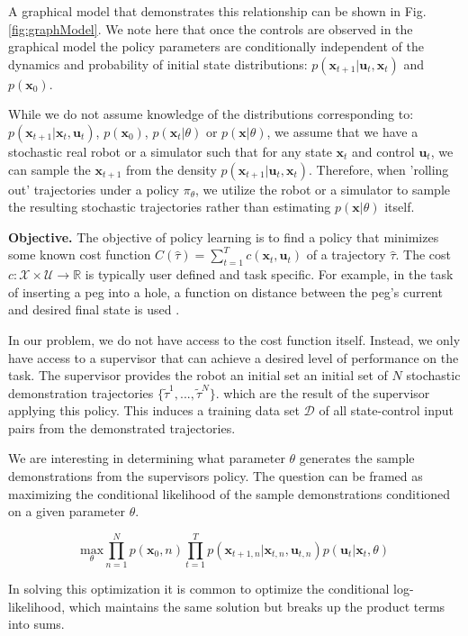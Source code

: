 \documentclass[10pt, conference]{ieeeconf}      %
\newcommand{\bu}{\mathbf{u}}
\newcommand{\bx}{\mathbf{x}}
\begin{document}
A graphical model that demonstrates this relationship can be shown in Fig. \ref{fig:graphModel}. We note here that once the controls are observed in the graphical model the policy parameters are conditionally independent of the dynamics and probability of initial state distributions: $p(\bx_{t+1}|\bu_t,\bx_t)$ and $p(\bx_0)$. 


While we do not assume knowledge of the distributions corresponding to: $p(\bx_{t+1}|\bx_t,\bu_t)$, $p(\bx_0)$, $p(\bx_t|
\theta)$ or $p(\bx|\theta)$, we assume that we have a stochastic real robot or a simulator such that for any state
$\bx_t$ and control $\bu_t$, we can sample the $\bx_{t+1}$ from the density $p(\bx_{t+1}|\bu_t,\bx_t)$. 
Therefore, when 'rolling out' trajectories under a policy
$\pi_{\theta}$, we utilize the robot or a simulator to sample the resulting stochastic trajectories rather than
estimating $p(\bx|\theta)$ itself.


\noindent\textbf{Objective.} The objective of  policy learning is to find a policy that minimizes some known cost function $C(\hat{\tau}) = \sum^T_{t=1} c(\bx_t,\bu_t)$ of a trajectory $\hat{\tau}$. The cost $c:\mathcal{X}\times \mathcal{U}\to \mathbb{R}$ is typically user defined and task specific. 
For example, in the task of inserting a peg into a hole, a function on distance between the peg's current and desired final state is used \cite{levine2015end}.  

In our problem, we do not have access to the cost function itself. Instead, we only have access to 
a supervisor that can achieve a desired level of performance on the task. The supervisor provides the robot an initial set
an initial set of $N$ stochastic demonstration trajectories $\lbrace \tilde{\tau}^1,...,\tilde{\tau}^N \rbrace$. 
which are the result of the supervisor applying this policy. This induces a training data set $\mathcal{D}$ of all state-control input pairs from the demonstrated trajectories.

We are interesting in determining what parameter $\theta$ generates the sample demonstrations from the supervisors policy. The question can be framed as maximizing the conditional likelihood of the sample demonstrations conditioned on a given parameter $\theta$. 

$$\underset{\theta}{\mbox{max}} \prod^N_{n=1} p(\bx_0,n) \prod^T_{t=1} p(\bx_{t+1,n}|\bx_{t,n},\bu_{t,n})p(\bu_t|\bx_t,\theta)$$

In solving this optimization it is common to optimize the conditional log-likelihood, which maintains the same solution but breaks up the product terms into sums. 
\end{document}
